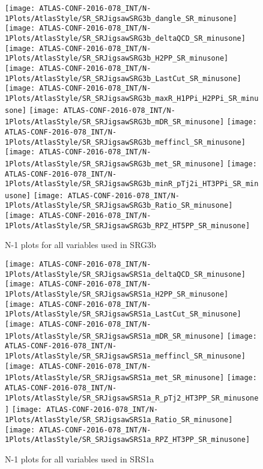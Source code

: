 \begin{figure}[tbp]
\begin{center}
\texttt{[image: ATLAS-CONF-2016-078\_INT/N-1Plots/AtlasStyle/SR\_SRJigsawSRG3b\_dangle\_SR\_minusone]}
\texttt{[image: ATLAS-CONF-2016-078\_INT/N-1Plots/AtlasStyle/SR\_SRJigsawSRG3b\_deltaQCD\_SR\_minusone]}
\texttt{[image: ATLAS-CONF-2016-078\_INT/N-1Plots/AtlasStyle/SR\_SRJigsawSRG3b\_H2PP\_SR\_minusone]}
\texttt{[image: ATLAS-CONF-2016-078\_INT/N-1Plots/AtlasStyle/SR\_SRJigsawSRG3b\_LastCut\_SR\_minusone]}
\texttt{[image: ATLAS-CONF-2016-078\_INT/N-1Plots/AtlasStyle/SR\_SRJigsawSRG3b\_maxR\_H1PPi\_H2PPi\_SR\_minusone]}
\texttt{[image: ATLAS-CONF-2016-078\_INT/N-1Plots/AtlasStyle/SR\_SRJigsawSRG3b\_mDR\_SR\_minusone]}
\texttt{[image: ATLAS-CONF-2016-078\_INT/N-1Plots/AtlasStyle/SR\_SRJigsawSRG3b\_meffincl\_SR\_minusone]}
\texttt{[image: ATLAS-CONF-2016-078\_INT/N-1Plots/AtlasStyle/SR\_SRJigsawSRG3b\_met\_SR\_minusone]}
\texttt{[image: ATLAS-CONF-2016-078\_INT/N-1Plots/AtlasStyle/SR\_SRJigsawSRG3b\_minR\_pTj2i\_HT3PPi\_SR\_minusone]}
\texttt{[image: ATLAS-CONF-2016-078\_INT/N-1Plots/AtlasStyle/SR\_SRJigsawSRG3b\_Ratio\_SR\_minusone]}
\texttt{[image: ATLAS-CONF-2016-078\_INT/N-1Plots/AtlasStyle/SR\_SRJigsawSRG3b\_RPZ\_HT5PP\_SR\_minusone]}
\end{center}
\caption{N-1 plots for all variables used in SRG3b}
\label{fig:SR_SRJigsawSRG3a_minR_pTj2i_HT3PPi_SR_minusone}
\end{figure}
\clearpage

\begin{figure}[tbp]
\begin{center}
\texttt{[image: ATLAS-CONF-2016-078\_INT/N-1Plots/AtlasStyle/SR\_SRJigsawSRS1a\_deltaQCD\_SR\_minusone]}
\texttt{[image: ATLAS-CONF-2016-078\_INT/N-1Plots/AtlasStyle/SR\_SRJigsawSRS1a\_H2PP\_SR\_minusone]}
\texttt{[image: ATLAS-CONF-2016-078\_INT/N-1Plots/AtlasStyle/SR\_SRJigsawSRS1a\_LastCut\_SR\_minusone]}
\texttt{[image: ATLAS-CONF-2016-078\_INT/N-1Plots/AtlasStyle/SR\_SRJigsawSRS1a\_mDR\_SR\_minusone]}
\texttt{[image: ATLAS-CONF-2016-078\_INT/N-1Plots/AtlasStyle/SR\_SRJigsawSRS1a\_meffincl\_SR\_minusone]}
\texttt{[image: ATLAS-CONF-2016-078\_INT/N-1Plots/AtlasStyle/SR\_SRJigsawSRS1a\_met\_SR\_minusone]}
\texttt{[image: ATLAS-CONF-2016-078\_INT/N-1Plots/AtlasStyle/SR\_SRJigsawSRS1a\_R\_pTj2\_HT3PP\_SR\_minusone]}
\texttt{[image: ATLAS-CONF-2016-078\_INT/N-1Plots/AtlasStyle/SR\_SRJigsawSRS1a\_Ratio\_SR\_minusone]}
\texttt{[image: ATLAS-CONF-2016-078\_INT/N-1Plots/AtlasStyle/SR\_SRJigsawSRS1a\_RPZ\_HT3PP\_SR\_minusone]}
\end{center}
\caption{N-1 plots for all variables used in SRS1a}
\label{fig:SR_SRJigsawSRG3b_Ratio_SR_minusone}
\end{figure}

